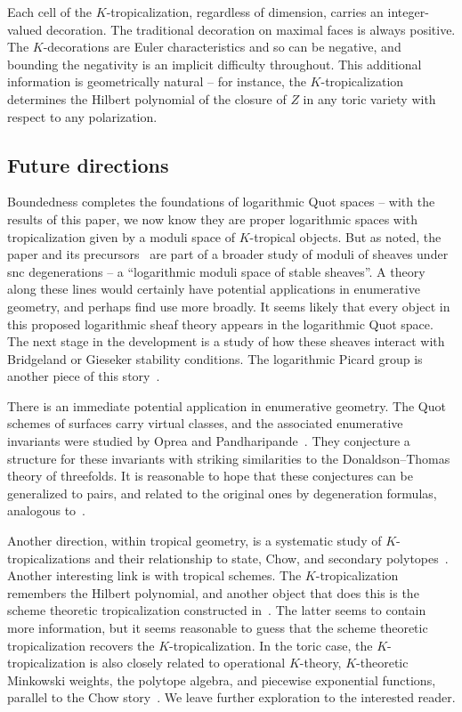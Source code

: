 \documentclass[11pt]{amsart}
\theoremstyle{definition}
\theoremstyle{definition}
\begin{document}
Each cell of the $K$-tropicalization, regardless of dimension, carries an integer-valued decoration. The traditional decoration on maximal faces is always positive. The $K$-decorations are Euler characteristics and so can be negative, and bounding the negativity is an implicit difficulty throughout. This additional information is geometrically natural -- for instance, the $K$-tropicalization determines the Hilbert polynomial of the closure of $Z$ in any toric variety with respect to any polarization.


\subsection{Future directions} Boundedness completes the foundations of logarithmic Quot spaces -- with the results of this paper, we now know they are proper logarithmic spaces with tropicalization given by a moduli space of $K$-tropical objects.  But as noted, the paper and its precursors~\cite{Logquot,MR20,MR23} are part of a broader study of moduli of sheaves under snc degenerations -- a ``logarithmic moduli space of stable sheaves''. A theory along these lines would certainly have potential applications in enumerative geometry, and perhaps find use more broadly. It seems likely that every object in this proposed logarithmic sheaf theory appears in the logarithmic Quot space. The next stage in the development is a study of how these sheaves interact with Bridgeland or Gieseker stability conditions. The logarithmic Picard group is another piece of this story~\cite{MolchoWise}. 

There is an immediate potential application in enumerative geometry. The Quot schemes of surfaces carry virtual classes, and the associated enumerative invariants were studied by Oprea and Pandharipande~\cite{OpreaPandharipande}. They conjecture a structure for these invariants with striking similarities to the Donaldson--Thomas theory of threefolds. It is reasonable to hope that these conjectures can be generalized to pairs, and related to the original ones by degeneration formulas, analogous to~\cite{MR23}. 

Another direction, within tropical geometry, is a systematic study of $K$-tropicalizations and their relationship to state, Chow, and secondary polytopes~\cite{KSZ92,Sturmfels96}. Another interesting link is with tropical schemes. The $K$-tropicalization remembers the Hilbert polynomial, and another object that does this is the scheme theoretic tropicalization constructed in~\cite{GG16}. The latter seems to contain more information, but it seems reasonable to guess that the scheme theoretic tropicalization recovers the $K$-tropicalization. In the toric case, the $K$-tropicalization is also closely related to operational $K$-theory, $K$-theoretic Minkowski weights, the polytope algebra, and piecewise exponential functions, parallel to the Chow story~\cite{AP15,KP08,Mor93,Shah22}. We leave further exploration to the interested reader.
\end{document}
